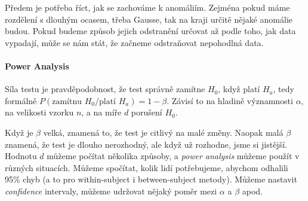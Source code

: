 \documentclass[10pt,a4paper]{article}
\begin{document}
Předem je potřeba říct, jak se zachováme k anomáliím. Zejména pokud máme rozdělení s dlouhým ocasem, třeba Gausse, tak na kraji určitě nějaké anomálie budou. Pokud budeme způsob jejich odstranění určovat až podle toho, jak data vypadají, může se nám stát, že začneme odstraňovat nepohodlná data.

\paragraph{Power Analysis}

Síla testu je pravděpodobnost, že test správně zamítne $H_0$, když platí $H_a$, tedy formálně $P(\text{zamítnu~} H_0/\text{platí~} H_a) = 1 - \beta$. Závisí to na hladině významnosti $\alpha$, na velikosti vzorku $n$, a na míře $d$ porušení $H_0$.

Když je $\beta$ velká, znamená to, že test je citlivý na malé změny. Naopak malá $\beta$ znamená, že test je dlouho nerozhodný, ale když už rozhodne, jsme si jistější. Hodnotu $d$ můžeme počítat několika způsoby, a \textit{power analysis} můžeme použít v různých situacích. Můžeme spočítat, kolik lidí potřebujeme, abychom odhalili 95\% chyb (a to pro within-subject i between-subject metody). Můžeme nastavit \textit{confidence} intervaly, můžeme udržovat nějaký poměr mezi $\alpha$ a $\beta$ apod.
\end{document}
